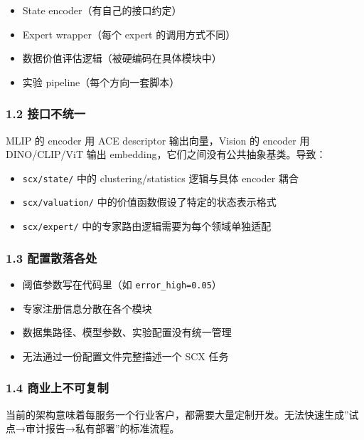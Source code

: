 \documentclass[
  12pt,
]{ctexart}
\providecommand{\tightlist}{%
  \setlength{\itemsep}{0pt}\setlength{\parskip}{0pt}}
\begin{document}
\begin{itemize}
\tightlist
\item
  State encoder（有自己的接口约定）
\item
  Expert wrapper（每个 expert 的调用方式不同）
\item
  数据价值评估逻辑（被硬编码在具体模块中）
\item
  实验 pipeline（每个方向一套脚本）
\end{itemize}

\subsubsection{1.2 接口不统一}\label{ux63a5ux53e3ux4e0dux7edfux4e00}

MLIP 的 encoder 用 ACE descriptor 输出向量，Vision 的 encoder 用
DINO/CLIP/ViT 输出 embedding，它们之间没有公共抽象基类。导致：

\begin{itemize}
\tightlist
\item
  \texttt{scx/state/} 中的 clustering/statistics 逻辑与具体 encoder 耦合
\item
  \texttt{scx/valuation/} 中的价值函数假设了特定的状态表示格式
\item
  \texttt{scx/expert/} 中的专家路由逻辑需要为每个领域单独适配
\end{itemize}

\subsubsection{1.3
配置散落各处}\label{ux914dux7f6eux6563ux843dux5404ux5904}

\begin{itemize}
\tightlist
\item
  阈值参数写在代码里（如 \texttt{error\_high=0.05}）
\item
  专家注册信息分散在各个模块
\item
  数据集路径、模型参数、实验配置没有统一管理
\item
  无法通过一份配置文件完整描述一个 SCX 任务
\end{itemize}

\subsubsection{1.4
商业上不可复制}\label{ux5546ux4e1aux4e0aux4e0dux53efux590dux5236}

当前的架构意味着每服务一个行业客户，都需要大量定制开发。无法快速生成''试点→审计报告→私有部署''的标准流程。
\end{document}
